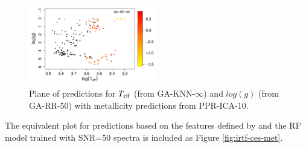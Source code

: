  \begin{figure}
 \centering
 \includegraphics[width=0.5\textwidth]{figs/ordieres-fig8.pdf}
\caption{Plane of predictions for $T_{\rm eff}$ (from GA-KNN-$\infty$)
and $log(g)$ (from GA-RR-50) with metallicity predictions from
PPR-ICA-10.}
\label{fig:irtf-teff-logg-met}
\end {figure}

The equivalent plot for predictions based on the features defined
by \cite{cesetti} and the RF model trained with SNR=50 spectra is
included as Figure \ref{fig:irtf-ces-met}.


